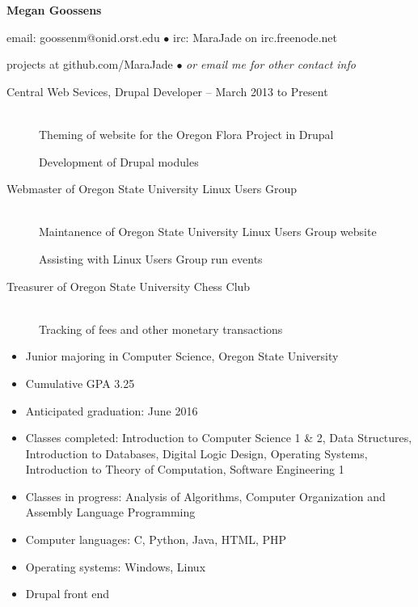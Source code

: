 \documentclass[11pt]{article}
\begin{document}
\centerline{{\LARGE \bf Megan Goossens}}

\bigskip

\centerline{email: goossenm@onid.orst.edu
        $\bullet$
        irc: MaraJade on irc.freenode.net}
\centerline{projects at github.com/MaraJade 
        $\bullet$
        \emph{or email me for other contact info}}

\bigskip
\hrulefill
\bigskip

\begin{description}
\item[Central Web Sevices, Drupal Developer -- March 2013 to Present]
    \hfill \\
    Theming of website for the Oregon Flora Project in Drupal
    
    Development of Drupal modules
\end{description}

\smallskip
\hrulefill
\bigskip

\begin{description}
     \item[Webmaster of Oregon State University Linux Users Group]
        \hfill \\
        Maintanence of Oregon State University Linux Users Group website

        Assisting with Linux Users Group run events

   \item[Treasurer of Oregon State University Chess Club]
        \hfill \\ 
        Tracking of fees and other monetary transactions
\end{description}

\smallskip
\hrulefill
\bigskip

\begin{itemize}
    \item Junior majoring in Computer Science, Oregon State University 

    \item Cumulative GPA 3.25

    \item Anticipated graduation: June 2016

    \item Classes completed: Introduction to Computer Science 1 \& 2, Data Structures, Introduction to Databases, Digital Logic Design, Operating Systems, Introduction to Theory of Computation, Software Engineering 1


    \item Classes in progress: Analysis of Algorithms, Computer Organization and Assembly Language Programming
    \end{itemize}

\begin{itemize}
  \item Computer languages: C, Python, Java, HTML, PHP

  \item Operating systems: Windows, Linux

  \item Drupal front end
\end{itemize}
\end{document}
